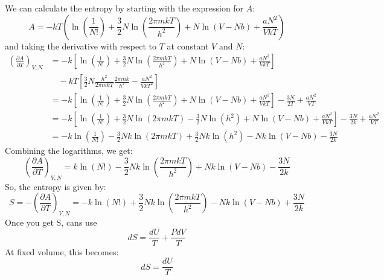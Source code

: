 \documentclass[10pt]{article}
\begin{document}
We can calculate the entropy by starting with the expression for \( A \):
\begin{equation}
  A = - k T \left( \ln \left( \frac{1}{N !} \right) + \frac{3}{2} N \ln \left( \frac{2 \pi m k T}{h^{2}} \right) + N \ln \left( V-N b \right) + \frac{a N^{2}}{V k T} \right)
\end{equation}
and taking the derivative with respect to \( T \) at constant \( V \) and \( N \):
\begin{align}
  \left( \frac{\partial A}{\partial T} \right)_{V,N} &= - k \left[ \ln \left( \frac{1}{N !} \right) + \frac{3}{2} N \ln \left( \frac{2 \pi m k T}{h^{2}} \right) + N \ln \left( V-N b \right) + \frac{a N^{2}}{V k T} \right] \\
  &\quad - k T \left[ \frac{3}{2} N \frac{h^2}{2\pi mk T} \frac{2\pi mk}{h^2} - \frac{a N^{2}}{V k T^{2}} \right] \\
  &= - k \left[ \ln \left( \frac{1}{N !} \right) + \frac{3}{2} N \ln \left( \frac{2 \pi m k T}{h^{2}} \right) + N \ln \left( V-N b \right) + \frac{a N^{2}}{V k T} \right] - \frac{3N}{2T} + \frac{a N^{2}}{V T} \\
  &= - k \left[ \ln \left( \frac{1}{N !} \right) + \frac{3}{2} N \ln \left( 2 \pi m k T \right) - \frac{3}{2} N \ln \left( h^{2} \right) + N \ln \left( V-N b \right) + \frac{a N^{2}}{V k T} \right] - \frac{3N}{2k} + \frac{a N^{2}}{V T} \\
  &= -k \ln \left( \frac{1}{N !} \right) - \frac{3}{2} N k \ln \left( 2 \pi m k T \right) + \frac{3}{2} N k \ln \left( h^{2} \right) - N k \ln \left( V-N b \right) - \frac{3N}{2k}
\end{align}
Combining the logarithms, we get:
\begin{equation}
  \left( \frac{\partial A}{\partial T} \right)_{V,N} = k \ln (N!) - \frac{3}{2} N k \ln \left( \frac{2 \pi m k T}{h^{2}} \right) + Nk \ln \left( V-N b \right) - \frac{3N}{2k}
\end{equation}
So, the entropy is given by:
\begin{equation}
  S = - \left( \frac{\partial A}{\partial T} \right)_{V,N} = - k \ln (N!) + \frac{3}{2} N k \ln \left( \frac{2 \pi m k T}{h^{2}} \right) - Nk \ln \left( V-N b \right) + \frac{3N}{2k}
\end{equation}
Once you get S, cans use
\begin{equation}
  dS = \frac{dU}{T} + \frac{PdV}{T}
\end{equation}
At fixed volume, this becomes:
\begin{equation}
  dS = \frac{dU}{T}
\end{equation}
\end{document}
